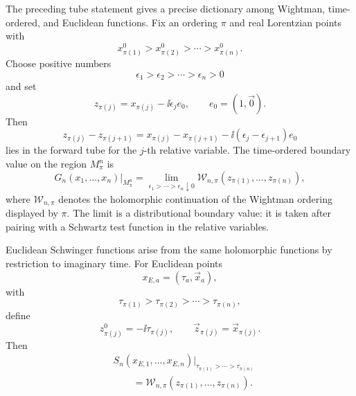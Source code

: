 \begin{definition}
\label{def:ordered-lorentzian-euclidean-boundary-values}
The preceding tube statement gives a precise dictionary among Wightman,
time-ordered, and Euclidean functions.  Fix an ordering \(\pi\) and real
Lorentzian points with
\[
  x_{\pi(1)}^0>x_{\pi(2)}^0>\cdots>x_{\pi(n)}^0 .
\]
Choose positive numbers
\[
  \epsilon_1>\epsilon_2>\cdots>\epsilon_n>0
\]
and set
\[
  z_{\pi(j)}=x_{\pi(j)}-\ii\epsilon_j e_0,
  \qquad e_0=(1,\vec0).
\]
Then
\[
  z_{\pi(j)}-z_{\pi(j+1)}
  =
  x_{\pi(j)}-x_{\pi(j+1)}
  -
  \ii(\epsilon_j-\epsilon_{j+1})e_0
\]
lies in the forward tube for the \(j\)-th relative variable.  The
time-ordered boundary value on the region \(M_\pi^n\) is
\[
  G_n(x_1,\ldots,x_n)\big|_{M_\pi^n}
  =
  \lim_{\epsilon_1>\cdots>\epsilon_n\downarrow0}
  \mathcal W_{n,\pi}(z_{\pi(1)},\ldots,z_{\pi(n)}),
\]
where \(\mathcal W_{n,\pi}\) denotes the holomorphic continuation of the
Wightman ordering displayed by \(\pi\).  The limit is a distributional
boundary value: it is taken after pairing with a Schwartz test function in
the relative variables.

Euclidean Schwinger functions arise from the same holomorphic functions by
restriction to imaginary time.  For Euclidean points
\[
  x_{E,a}=(\tau_a,\vec x_a),
\]
with
\[
  \tau_{\pi(1)}>\tau_{\pi(2)}>\cdots>\tau_{\pi(n)},
\]
define
\[
  z_{\pi(j)}^0=-\ii\tau_{\pi(j)},
  \qquad
  \vec z_{\pi(j)}=\vec x_{\pi(j)} .
\]
Then
\[
\begin{aligned}
  &S_n(x_{E,1},\ldots,x_{E,n})
    \big|_{\tau_{\pi(1)}>\cdots>\tau_{\pi(n)}}  \\
  &\qquad =
  \mathcal W_{n,\pi}(z_{\pi(1)},\ldots,z_{\pi(n)}).
\end{aligned}
\]
\end{definition}

